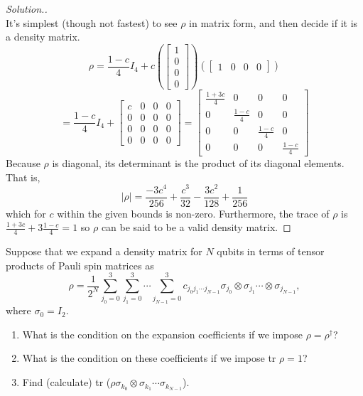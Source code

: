 \documentclass[12pt]{article}
\newenvironment{problem}[2][Problem]{\begin{trivlist}
\item[\hskip \labelsep {\bfseries #1}\hskip \labelsep {\bfseries #2.}]}{\end{trivlist}}
\begin{document}
\begin{proof}[Solution.]~\\
It's simplest (though not fastest) to see $\rho$ in matrix form, and then
decide if it is a density matrix.
$$\rho=\frac{1-c}{4}I_4+c\left(\begin{bmatrix}
1\\
0\\
0\\
0
\end{bmatrix}\right)\left(\begin{bmatrix}
1 & 0 & 0 & 0
\end{bmatrix}\right)$$
$$=\frac{1-c}{4}I_4+\begin{bmatrix}
c & 0 & 0 & 0\\
0 & 0 & 0 & 0\\
0 & 0 & 0 & 0\\
0 & 0 & 0 & 0
\end{bmatrix}=\begin{bmatrix}
\frac{1+3c}{4} & 0 & 0 & 0\\
0 & \frac{1-c}{4} & 0 & 0\\
0 & 0 & \frac{1-c}{4} & 0\\
0 & 0 & 0 & \frac{1-c}{4}
\end{bmatrix}$$
Because $\rho$ is diagonal, its determinant is the product of its diagonal
elements. That is,
$$|\rho|=\frac{-3c^4}{256}+\frac{c^3}{32}-\frac{3c^2}{128}+\frac{1}{256}$$
which for $c$ within the given bounds is non-zero. Furthermore, the trace of
$\rho$ is $\frac{1+3c}{4}+3\frac{1-c}{4}=1$ so $\rho$ can be said to be a valid
density matrix.
\end{proof}

\begin{problem}{D2}
Suppose that we expand a density matrix for $N$ qubits in terms of tensor products
of Pauli spin matrices as
$$\rho=\frac{1}{2^N}\sum_{j_0=0}^3\sum^3_{j_1=0}\cdots\sum^3_{j_{N-1}=0}c_{j_0j_1\cdots j_{N-1}}\sigma_{j_0}\otimes\sigma_{j_1}\cdots\otimes\sigma_{j_{N-1}},$$
where $\sigma_0=I_2$.
\begin{enumerate}[label=(\roman*)]
\item What is the condition on the expansion coefficients if we impose $\rho=\rho^\dagger$?
\item What is the condition on these coefficients if we impose tr $\rho=1$?
\item Find (calculate) tr ($\rho\sigma_{k_0}\otimes\sigma_{k_1}\cdots\sigma_{k_{N-1}}$).
\end{enumerate}
\end{problem}
\end{document}
